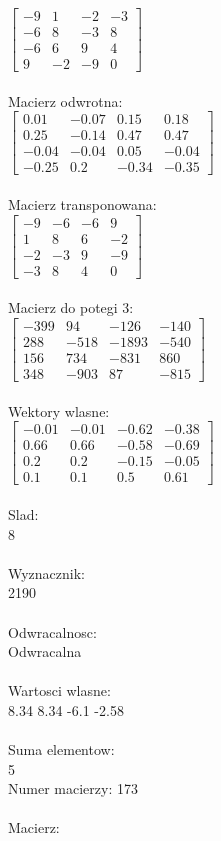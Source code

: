 \documentclass[a4paper,12pt]{article}
\begin{document}
$\begin{bmatrix} -9&1&-2&-3\\-6&8&-3&8\\-6&6&9&4\\9&-2&-9&0 \end{bmatrix}$
\\
\\
Macierz odwrotna:\\

$\begin{bmatrix} 0.01&-0.07&0.15&0.18\\0.25&-0.14&0.47&0.47\\-0.04&-0.04&0.05&-0.04\\-0.25&0.2&-0.34&-0.35 \end{bmatrix}$
\\
\\
Macierz transponowana:\\

$\begin{bmatrix} -9&-6&-6&9\\1&8&6&-2\\-2&-3&9&-9\\-3&8&4&0 \end{bmatrix}$
\\
\\
Macierz do potegi 3:\\

$\begin{bmatrix} -399&94&-126&-140\\288&-518&-1893&-540\\156&734&-831&860\\348&-903&87&-815 \end{bmatrix}$
\\
\\
Wektory wlasne:\\

$\begin{bmatrix} -0.01&-0.01&-0.62&-0.38\\0.66&0.66&-0.58&-0.69\\0.2&0.2&-0.15&-0.05\\0.1&0.1&0.5&0.61 \end{bmatrix}$
\\
\\
Slad:\\
8
\\
\\
Wyznacznik:\\
2190
\\
\\
Odwracalnosc:\\
Odwracalna
\\
\\
Wartosci wlasne:\\
8.34 8.34 -6.1 -2.58
\\
\\
Suma elementow:\\
5
\\
\newpage
Numer macierzy:
173
\\
\\
Macierz:\\
\end{document}
